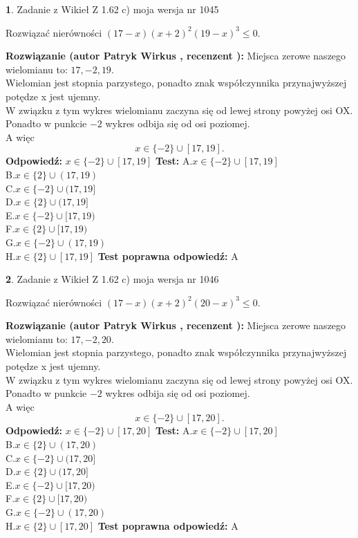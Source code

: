 \documentclass[12pt, a4paper]{article}
\theoremstyle{definition} %
\newtheorem{zad}{}
\newcommand{\zadStart}[1]{\begin{zad}#1\newline}
\newcommand{\zadStop}{\end{zad}}
\newcommand{\rozwStart}[2]{\noindent \textbf{Rozwiązanie (autor #1 , recenzent #2): }\newline}
\newcommand{\rozwStop}{\newline}
\newcommand{\odpStart}{\noindent \textbf{Odpowiedź:}\newline}
\newcommand{\odpStop}{\newline}
\newcommand{\testStart}{\noindent \textbf{Test:}\newline}
\newcommand{\testStop}{\newline}
\newcommand{\kluczStart}{\noindent \textbf{Test poprawna odpowiedź:}\newline}
\newcommand{\kluczStop}{\newline}
\begin{document}
\zadStart{Zadanie z Wikieł Z 1.62 c) moja wersja nr 1045}

Rozwiązać nierówności $(17-x)(x+2)^{2}(19-x)^{3}\le0$.
\zadStop
\rozwStart{Patryk Wirkus}{}
Miejsca zerowe naszego wielomianu to: $17, -2, 19$.\\
Wielomian jest stopnia parzystego, ponadto znak współczynnika przy\linebreak najwyższej potędze x jest ujemny.\\ W związku z tym wykres wielomianu zaczyna się od lewej strony powyżej osi OX.\\
Ponadto w punkcie $-2$ wykres odbija się od osi poziomej.\\
A więc $$x \in \{-2\} \cup [17,19].$$
\rozwStop
\odpStart
$x \in \{-2\} \cup [17,19]$
\odpStop
\testStart
A.$x \in \{-2\} \cup [17,19]$\\
B.$x \in \{2\} \cup (17,19)$\\
C.$x \in \{-2\} \cup (17,19]$\\
D.$x \in \{2\} \cup (17,19]$\\
E.$x \in \{-2\} \cup [17,19)$\\
F.$x \in \{2\} \cup [17,19)$\\
G.$x \in \{-2\} \cup (17,19)$\\
H.$x \in \{2\} \cup [17,19]$
\testStop
\kluczStart
A
\kluczStop



\zadStart{Zadanie z Wikieł Z 1.62 c) moja wersja nr 1046}

Rozwiązać nierówności $(17-x)(x+2)^{2}(20-x)^{3}\le0$.
\zadStop
\rozwStart{Patryk Wirkus}{}
Miejsca zerowe naszego wielomianu to: $17, -2, 20$.\\
Wielomian jest stopnia parzystego, ponadto znak współczynnika przy\linebreak najwyższej potędze x jest ujemny.\\ W związku z tym wykres wielomianu zaczyna się od lewej strony powyżej osi OX.\\
Ponadto w punkcie $-2$ wykres odbija się od osi poziomej.\\
A więc $$x \in \{-2\} \cup [17,20].$$
\rozwStop
\odpStart
$x \in \{-2\} \cup [17,20]$
\odpStop
\testStart
A.$x \in \{-2\} \cup [17,20]$\\
B.$x \in \{2\} \cup (17,20)$\\
C.$x \in \{-2\} \cup (17,20]$\\
D.$x \in \{2\} \cup (17,20]$\\
E.$x \in \{-2\} \cup [17,20)$\\
F.$x \in \{2\} \cup [17,20)$\\
G.$x \in \{-2\} \cup (17,20)$\\
H.$x \in \{2\} \cup [17,20]$
\testStop
\kluczStart
A
\kluczStop
\end{document}
